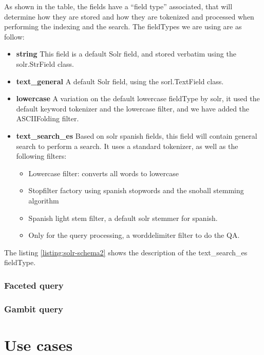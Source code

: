 As shown in the table, the fields have a ``field type'' associated, that will determine how they are stored and how they are tokenized and processed when performing the indexing and the search. The fieldTypes we are using are as follow:

\begin{itemize}
 \item \textbf{ string } This field is a default Solr field, and stored verbatim using the solr.StrField class.
 \item \textbf{ text\_general } A default Solr field, using the sorl.TextField class.
 \item \textbf{ lowercase } A variation on the default lowercase fieldType by solr, it used the default keyword tokenizer and the lowercase filter, and we have added the ASCIIFolding filter.
 \item \textbf{ text\_search\_es } Based on solr spanish fields, this field will contain general search to perform a search. It uses a standard tokenizer, as well as the following filters:
 \begin{itemize}
  \item Lowercase filter: converts all words to lowercase 
  \item Stopfilter factory using spanish stopwords and the snoball stemming algorithm
  \item Spanish light stem filter, a default solr stemmer for spanish.
  \item Only for the query processing, a worddelimiter filter to do the QA.
 \end{itemize}
\end{itemize}

The listing \ref{listing:solr-schema2} shows the description of the text\_search\_es fieldType.

\label{listing:solr-schema2}

\subsubsection{Faceted query}

\subsubsection{Gambit query}

\section{Use cases}

